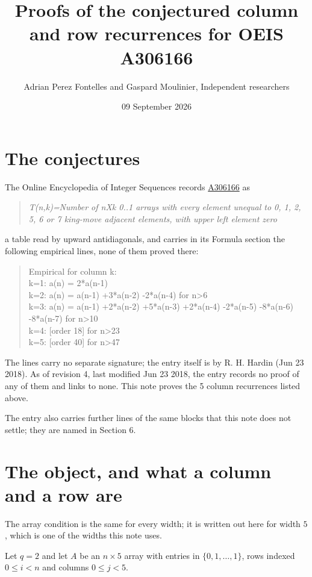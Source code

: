 \documentclass[11pt]{article}
\title{Proofs of the conjectured column and row recurrences for OEIS A306166}
\author{Adrian Perez Fontelles and Gaspard Moulinier, Independent researchers}
\date{09 September 2026}
\theoremstyle{definition}
\begin{document}
\maketitle
\section{The conjectures}

The Online Encyclopedia of Integer Sequences records \href{https://oeis.org/A306166}{A306166} as

\begin{quote}\itshape T(n,k)=Number of nXk 0..1 arrays with every element unequal to 0, 1, 2, 5, 6 or 7 king-move adjacent elements, with upper left element zero\end{quote}

a table read by upward antidiagonals, and carries in its Formula section the following empirical lines, none of them proved there:

\begin{quote}\ttfamily Empirical for column k:\\
k=1: a(n) = 2*a(n-1)\\k=2: a(n) = a(n-1) +3*a(n-2) -2*a(n-4) for n>6\\k=3: a(n) = a(n-1) +2*a(n-2) +5*a(n-3) +2*a(n-4) -2*a(n-5) -8*a(n-6) -8*a(n-7) for n>10\\k=4: [order 18] for n>23\\k=5: [order 40] for n>47\end{quote}

The lines carry no separate signature; the entry itself is by R. H. Hardin (Jun 23 2018). As of revision 4, last modified Jun 23 2018, the entry records no proof of any of them and links to none. This note proves the 5 column recurrences listed above.

The entry also carries further lines of the same blocks that this note does not settle; they are named in Section 6.

\section{The object, and what a column and a row are}

The array condition is the same for every width; it is written out here for width $5$, which is one of the widths this note uses.

Let $q = 2$ and let $A$ be an $n \times 5$ array with entries in $\{0,1,\dots,1\}$, rows indexed $0 \le i < n$ and columns $0 \le j < 5$.
\end{document}
